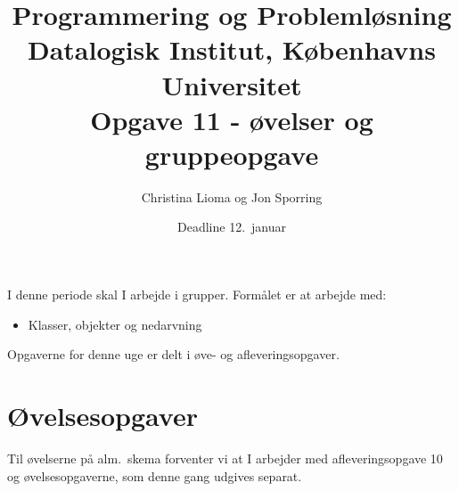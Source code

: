 \documentclass[a4paper,12pt]{article}
\title{Programmering og Problemløsning\\Datalogisk Institut,
  Københavns Universitet\\Opgave 11 - øvelser og  gruppeopgave}
\author{Christina Lioma og Jon Sporring}
\date{Deadline  12.\ januar}
\begin{document}
\maketitle

I denne periode skal I arbejde i grupper. Formålet er at arbejde med:
\begin{itemize}
\item Klasser, objekter og nedarvning
\end{itemize}

Opgaverne for denne uge er delt i øve- og afleveringsopgaver. 

\section*{Øvelsesopgaver}
Til øvelserne på alm.\ skema forventer vi at I arbejder med
afleveringsopgave 10 og øvelsesopgaverne, som denne gang udgives separat.
\end{document}
